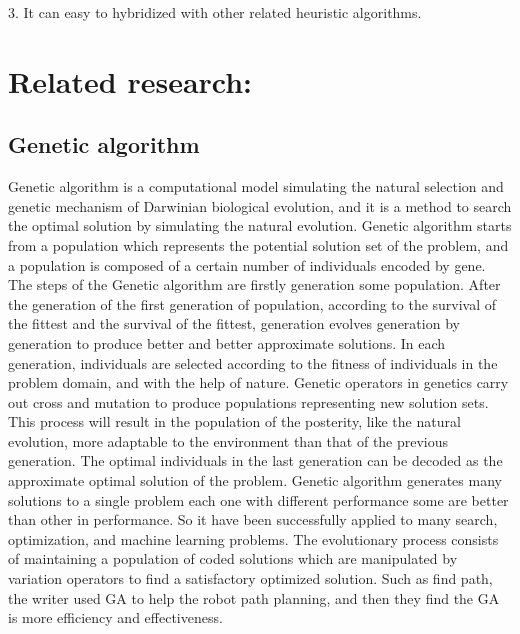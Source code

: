\documentclass[12pt]{article}
\begin{document}
3.	It can easy to hybridized with other related heuristic algorithms.

\section{Related research:}	
\subsection{Genetic algorithm}
Genetic algorithm is a computational model simulating the natural selection and genetic mechanism of Darwinian biological evolution, and it is a method to search the optimal solution by simulating the natural evolution. Genetic algorithm starts from a population which represents the potential solution set of the problem, and a population is composed of a certain number of individuals encoded by gene. The steps of the Genetic algorithm are firstly generation some population. After the generation of the first generation of population, according to the survival of the fittest and the survival of the fittest, generation evolves generation by generation to produce better and better approximate solutions. In each generation, individuals are selected according to the fitness of individuals in the problem domain, and with the help of nature. Genetic operators in genetics carry out cross and mutation to produce populations representing new solution sets. This process will result in the population of the posterity, like the natural evolution, more adaptable to the environment than that of the previous generation. The optimal individuals in the last generation can be decoded as the approximate optimal solution of the problem. Genetic algorithm generates many solutions to a single problem each one with different performance some are better than other in performance. So it have been successfully applied to many search, optimization, and machine learning problems. The evolutionary process consists of maintaining a population of coded solutions which are manipulated by variation operators to find a satisfactory optimized solution. Such as find path, the writer used GA to help the robot path planning\cite{Alnasser2016}, and then they find the GA is more efficiency and effectiveness. 
\end{document}
